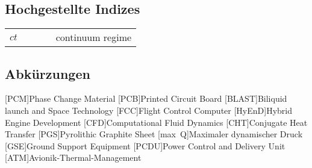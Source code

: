 \subsection*{Hochgestellte Indizes}

\begin{supertabular}{p{10mm}p{3mm}p{20mm}p{3mm}l}
$ct$ && && continuum regime\\
\end{supertabular} 

\newpage

\subsection*{Abkürzungen}
\begin{acronym}[BLAST]
[PCM]{Phase Change Material}
[PCB]{Printed Circuit Board}
[BLAST]{Biliquid launch and Space Technology}
[FCC]{Flight Control Computer}
[HyEnD]{Hybrid Engine Development}
[CFD]{Computational Fluid Dynamics}
[CHT]{Conjugate Heat Transfer}
[PGS]{Pyrolithic Graphite Sheet}
[max~Q]{Maximaler dynamischer Druck}
[GSE]{Ground Support Equipment}
[PCDU]{Power Control and Delivery Unit}
[ATM]{Avionik-Thermal-Management}
\end{acronym}